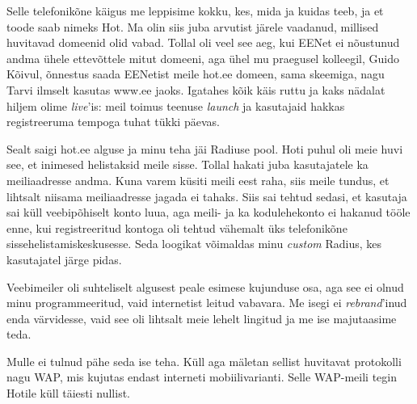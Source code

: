 Selle telefonikõne käigus me leppisime kokku, kes, mida ja kuidas teeb, ja et toode saab 
nimeks Hot. Ma olin siis juba arvutist järele vaadanud,
millised huvitavad domeenid olid vabad. Tollal oli veel see 
aeg, kui EENet ei nõustunud andma ühele ettevõttele mitut 
domeeni, aga ühel mu praegusel kolleegil, Guido 
Kõivul, õnnestus saada EENetist meile
hot.ee domeen, sama skeemiga, nagu 
Tarvi ilmselt kasutas www.ee jaoks. Igatahes kõik käis ruttu ja kaks nädalat hiljem olime \emph{live}'is: 
meil toimus teenuse \emph{launch} ja kasutajaid hakkas registreeruma 
tempoga tuhat tükki päevas.

Sealt saigi hot.ee alguse ja minu teha jäi Radiuse pool. 
Hoti puhul oli meie huvi see, et 
inimesed helistaksid meile sisse. Tollal hakati juba
kasutajatele ka meiliaadresse andma. Kuna varem küsiti meili eest raha, siis 
meile tundus, et lihtsalt niisama meiliaadresse jagada ei tahaks. Siis sai 
tehtud sedasi, et kasutaja sai küll veebipõhiselt konto luua, aga 
meili- ja ka kodulehekonto ei hakanud tööle enne, kui 
registreeritud kontoga oli tehtud vähemalt üks telefonikõne
sissehelistamiskeskusesse. Seda loogikat võimaldas minu \emph{custom} 
Radius, kes kasutajatel järge pidas. 


Veebimeiler oli suhteliselt algusest peale esimese 
kujunduse osa, aga see ei olnud minu programmeeritud, vaid internetist 
leitud vabavara. Me isegi ei \emph{rebrand}'inud enda värvidesse, vaid see oli lihtsalt meie lehelt 
lingitud ja me ise majutaasime teda.


Mulle ei tulnud pähe seda ise teha. Küll aga mäletan 
sellist huvitavat protokolli nagu WAP, mis kujutas endast interneti mobiilivarianti. Selle WAP-meili tegin Hotile küll täiesti 
nullist.


